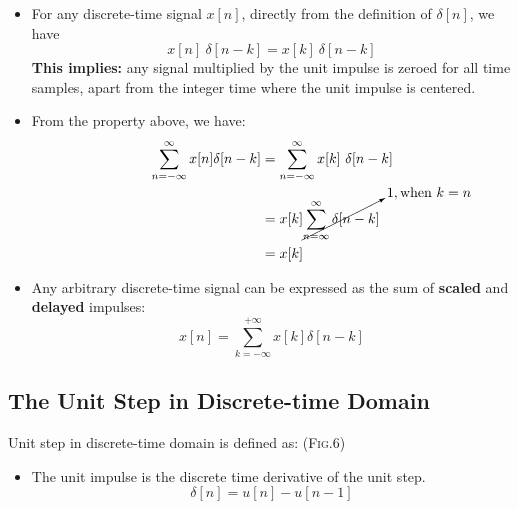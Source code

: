 \documentclass[12pt,a4paper]{article}
\begin{document}
\begin{itemize}
 \item For any discrete-time signal $x[n]$, directly from the definition of $\delta[n]$, we have
   \[ x[n] \ \delta[n-k] = x[k] \ \delta[n-k] \]
 \quad \textbf{This implies:} any signal multiplied by the unit impulse is zeroed for all time samples, apart from the integer
 time where the unit impulse is centered.
 \item From the property above, we have:
 \begin{align*} \begin{split}
  \sum_{n=-\infty}^{\infty}x[n]\delta[n-k]  &=  \sum_{n=-\infty}^{\infty}x[k] \ \delta[n-k] \\
  &= x[k] \cancelto{1, \text{when} \ k=n}{\sum_{n=\infty}^{\infty}\delta[n-k]} \\
  &= x[k]
 \end{split} \end{align*}
 \item Any arbitrary discrete-time signal can be expressed as the sum of \textbf{scaled} and \textbf{delayed} impulses:
 \[ x[n] = \sum_{k=-\infty}^{+\infty}x[k]\delta[n-k] \] 
\end{itemize}

\subsection{The Unit Step in Discrete-time Domain}
Unit step in discrete-time domain is defined as: (\textsc{Fig.6})\\
\begin{itemize}
 \item The unit impulse is the discrete time derivative of the unit step.
 \[ \delta[n] = u[n] - u[n-1] \]
\end{itemize}
\end{document}
